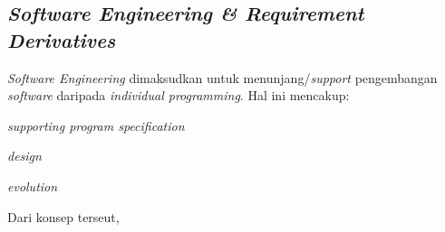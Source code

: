 \subsection{\textit{Software Engineering \& Requirement Derivatives}}

	\textit{Software Engineering} dimaksudkan untuk menunjang/\textit{support} pengembangan \textit{software} daripada \textit{individual programming}. Hal ini mencakup: \begin{inlinelist}
		\item \textit{supporting program specification}
		\item \textit{design}
		\item \textit{evolution}
	\end{inlinelist}
	
	Dari konsep terseut, 
	
